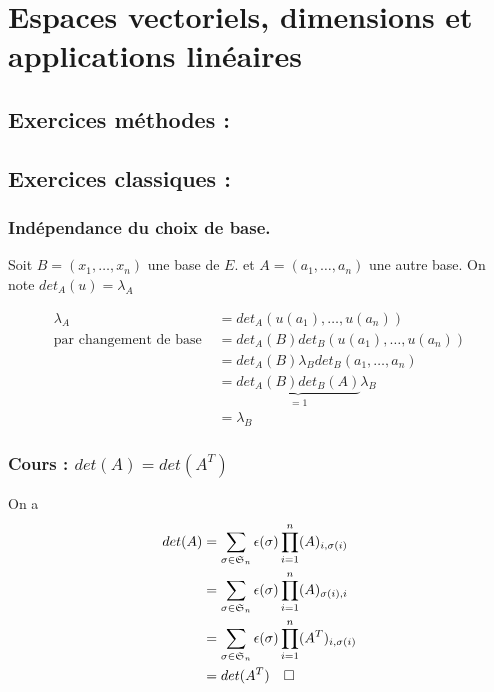 \section{Espaces vectoriels, dimensions et applications linéaires}
\subsection{Exercices méthodes :}
\subsection{Exercices classiques :}
\subsubsection{Indépendance du choix de base.}

Soit $B=(x_1,\dots,x_n)$  une base de $E$.
et $A=(a_1,\dots,a_n)$ une autre base.
On note $det_{A}(u) = \lambda_{A}$

$$
\begin{aligned} 
\lambda_A &= det_A(u(a_1),\dots,u(a_n)) \\
\text{par changement de base }&= det_A(B)det_B(u(a_1),\dots,u(a_n))
\\ &= det_A(B)\lambda_B det_B(a_1,\dots,a_n)
\\ &= \underbrace{det_A(B)det_B(A)}_{=1}\lambda_B 
\\ &= \lambda_B 
\end{aligned}
$$

\subsubsection{Cours : $det(A) = det(A^T)$}

On a $$ 
\begin{aligned}
    det(A) &= \sum_{\sigma \in \mathfrak{S}_n} \epsilon(\sigma) \prod_{i=1}^{n} (A)_{i,\sigma(i)} 
    \\ &= \sum_{\sigma \in \mathfrak{S}_n} \epsilon(\sigma) \prod_{i=1}^{n} (A)_{\sigma(i),i} 
    \\ &= \sum_{\sigma \in \mathfrak{S}_n} \epsilon(\sigma) \prod_{i=1}^{n} (A^T)_{i,\sigma(i)} 
    \\ &= det(A^T) \hspace{10px } \square
\end{aligned}
$$
